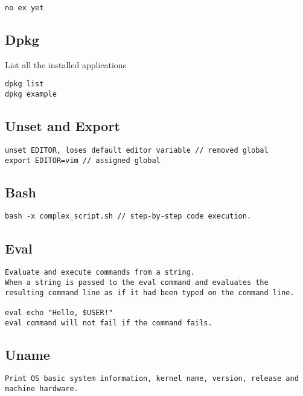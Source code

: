 \begin{verbatim}
no ex yet
\end{verbatim}

\subsection{Dpkg}

List all the installed applications

\begin{verbatim}
dpkg list
dpkg example 
\end{verbatim}

\subsection{Unset and Export}

\begin{verbatim}
unset EDITOR, loses default editor variable // removed global
export EDITOR=vim // assigned global
\end{verbatim}

\subsection{Bash}

\begin{verbatim}
bash -x complex_script.sh // step-by-step code execution. 
\end{verbatim}

\subsection{Eval}

\begin{verbatim}
Evaluate and execute commands from a string. 
When a string is passed to the eval command and evaluates the resulting command line as if it had been typed on the command line.

eval echo "Hello, $USER!"
eval command will not fail if the command fails.  
\end{verbatim}

\subsection{Uname}

\begin{verbatim}
Print OS basic system information, kernel name, version, release and machine hardware. 
\end{verbatim}

